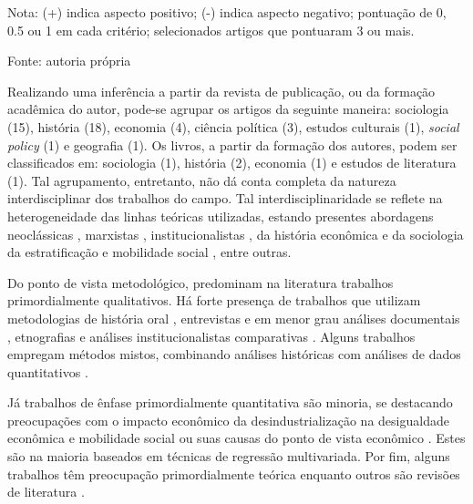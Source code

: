 \begin{table}[htbp]
\centering
\caption{Critérios de priorização de artigos}
\label{tab:cap02-criterios-priorizacao}
\end{table}

Nota: (+) indica aspecto positivo; (-) indica aspecto negativo; pontuação de 0, 0.5 ou 1 em cada critério; selecionados artigos que pontuaram 3 ou mais.

Fonte: autoria própria

Realizando uma inferência a partir da revista de publicação, ou da
formação acadêmica do autor, pode-se agrupar os artigos da seguinte
maneira: sociologia (15), história (18), economia (4), ciência política
(3), estudos culturais (1), \emph{social policy} (1) e geografia (1). Os
livros, a partir da formação dos autores, podem ser classificados em:
sociologia (1), história (2), economia (1) e estudos de literatura (1).
Tal agrupamento, entretanto, não dá conta completa da natureza
interdisciplinar dos trabalhos do campo. Tal interdisciplinaridade se
reflete na heterogeneidade das linhas teóricas utilizadas, estando
presentes abordagens neoclássicas
\citep{scheiring_deindustrialization_2023}, marxistas
\citep[p.~997]{high_wounds_2013},
institucionalistas
\citep{lee_institutional_2016}, da
história econômica
\citep{van_nederveen_meerkerk_challenging_2017} e da sociologia da estratificação e mobilidade social
\citep{kollmeyer_trade_2018},
entre outras.

Do ponto de vista metodológico, predominam na literatura trabalhos
primordialmente qualitativos. Há forte presença de trabalhos que
utilizam metodologias de história oral
\citep{clark_voices_2020,clarke_closing_2015,hodson_titanic_2019}, entrevistas
\citep{hoekstra_iconic_2020,nettleingham_beyond_2019,scheiring_left_2020,scheiring_deindustrialization_2023} e em
menor grau análises documentais
\citep{phillips_closure_2015,phillips_deindustrialization_2019}, etnografias
\citep{lewis_regenerating_2016} e
análises institucionalistas comparativas
\citep{lee_institutional_2016}.
Alguns trabalhos empregam métodos mistos, combinando análises históricas
com análises de dados quantitativos
\citep{tomlinson_-industrialization_2020,van_nederveen_meerkerk_challenging_2017}.

Já trabalhos de ênfase primordialmente quantitativa são minoria, se
destacando preocupações com o impacto econômico da desindustrialização
na desigualdade econômica e mobilidade social
\citep{berger_industrial_2022,kollmeyer_trade_2018} ou suas causas do ponto de vista econômico
\citep{kollmeyer_trade_2018,rodrik_premature_2016}. Estes são na maioria baseados em técnicas de
regressão multivariada. Por fim, alguns trabalhos têm preocupação
primordialmente teórica
\citep{strangleman_deindustrialisation_2017,tomlinson_-industrialization_2016} enquanto outros são revisões de literatura
\citep{emery_geographies_2019,high_wounds_2013,lawson_making_2020,strangleman_new_2014,strangleman_introduction_2013}.

